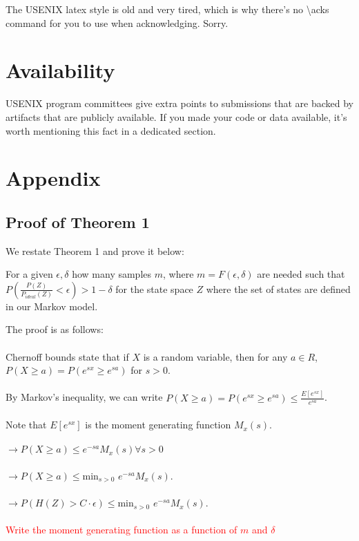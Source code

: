 The USENIX latex style is old and very tired, which is why
there's no \textbackslash{}acks command for you to use when
acknowledging. Sorry.

\section*{Availability}

USENIX program committees give extra points to submissions that are
backed by artifacts that are publicly available. If you made your code
or data available, it's worth mentioning this fact in a dedicated
section.

\section*{Appendix}
\subsection{Proof of Theorem 1}
We restate Theorem 1 and prove it below:

\begin{theorem}
\label{mainThm}
For a given $\epsilon, \delta$ how many samples $m$, where $m = F(\epsilon, \delta)$ are needed such that $P(\frac{P(Z)}{P_{ideal}(Z)}< \epsilon) > 1 - \delta$ for the state space $Z$ where the set of states are defined in our Markov model. 
\end{theorem}

The proof is as follows:
\\
\\
Chernoff bounds state that if $X$ is a random variable, then for any $a \in R$, $P(X \geq a) = P(e^{sx} \geq e^{sa})$ for $s > 0$. 
\\
\\
By Markov's inequality, we can write $P(X \geq a)  = P(e^{sx} \geq e^{sa}) \leq \frac{E[e^{sx}]}{e^{sa}}$. 
\\
\\
Note that $E[e^{sx}]$ is the moment generating function $M_{x}(s)$. 
\\
\\
$\rightarrow P(X \geq a) \leq e^{-sa} M_{x}(s) \forall s > 0$
\\
\\
$\rightarrow P(X \geq a) \leq $min$_{s >0}$ $e^{-sa} M_{x}(s)$.
\\
\\
$\rightarrow P(H(Z) > C \cdot \epsilon) \leq $min$_{s >0}$ $e^{-sa} M_{x}(s)$.
\\
\\
\textcolor{red}{Write the moment generating function as a function of $m$ and $\delta$}


